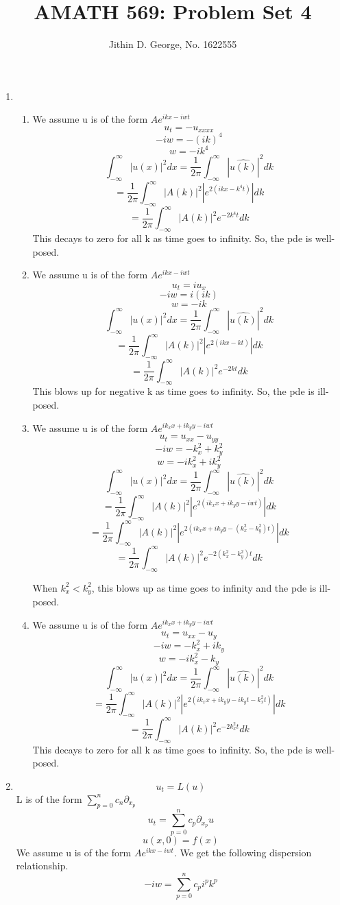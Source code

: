 \documentclass[a4paper,12 pt]{article}
\title{AMATH 569: Problem Set 4}
\author{Jithin D. George, No. 1622555}
\begin{document}
\maketitle
\begin{enumerate}
	\item
 
 \begin{enumerate}
	
	\item 
	We assume  u is of the form $A e^{ikx-iwt}$
	\[u_t=-u_{xxxx}\]
	\[-iw = - (ik)^4\]
	\[w= -ik^4\]
	\[\int_{-\infty}^{\infty}|u(x)|^2 dx= \frac{1}{2\pi}\int_{-\infty}^{\infty}|\hat{u(k)}|^2 dk\]
	\[= \frac{1}{2\pi}\int_{-\infty}^{\infty}|A(k)|^2|e^{2(ikx-k^4t)}| dk\]
	\[= \frac{1}{2\pi}\int_{-\infty}^{\infty}|A(k)|^2e^{-2k^4t} dk\]
	This decays to zero for all k as time goes to infinity. So, the pde is well-posed.
	\item
	We assume  u is of the form $A e^{ikx-iwt}$
	\[u_t=iu_{x}\]
	\[-iw = i(ik)\]
	\[w= -ik\]
	\[\int_{-\infty}^{\infty}|u(x)|^2 dx= \frac{1}{2\pi}\int_{-\infty}^{\infty}|\hat{u(k)}|^2 dk\]
	\[= \frac{1}{2\pi}\int_{-\infty}^{\infty}|A(k)|^2|e^{2(ikx-kt)}| dk\]
	\[= \frac{1}{2\pi}\int_{-\infty}^{\infty}|A(k)|^2 e^{-2kt}dk\]
	This blows up for negative k as time goes to infinity. So, the pde is ill-posed.
	\item
	We assume  u is of the form $A e^{ik_xx+ik_yy-iwt}$
	\[u_t=u_{xx}-u_{yy}\]
	\[-iw = -k_x^2+k_y^2\]
	\[w= -ik_x^2+ik_y^2\]
	\[\int_{-\infty}^{\infty}|u(x)|^2 dx= \frac{1}{2\pi}\int_{-\infty}^{\infty}|\hat{u(k)}|^2 dk\]
	\[= \frac{1}{2\pi}\int_{-\infty}^{\infty}|A(k)|^2|e^{2(ik_xx+ik_yy-iwt)}| dk\]
	\[= \frac{1}{2\pi}\int_{-\infty}^{\infty}|A(k)|^2|e^{2(ik_xx+ik_yy-(k_x^2-k_y^2)t)}| dk\]
	\[= \frac{1}{2\pi}\int_{-\infty}^{\infty}|A(k)|^2e^{-2(k_x^2-k_y^2)t} dk\]

	When $k_x^2< k_y^2$, this blows up as time goes to infinity and the pde is ill-posed.
	\item
	We assume  u is of the form $A e^{ik_xx+ik_yy-iwt}$
	\[u_t=u_{xx}-u_{y}\]
	\[-iw = -k_x^2+ik_y\]
	\[w= -ik_x^2-k_y\]
	\[\int_{-\infty}^{\infty}|u(x)|^2 dx= \frac{1}{2\pi}\int_{-\infty}^{\infty}|\hat{u(k)}|^2 dk\]
	\[= \frac{1}{2\pi}\int_{-\infty}^{\infty}|A(k)|^2|e^{2(ik_xx+ik_yy-ik_yt-k_x^2t)}| dk\]
	\[= \frac{1}{2\pi}\int_{-\infty}^{\infty}|A(k)|^2e^{-2k_x^2t} dk\]
	This decays to zero for all k as time goes to infinity. So, the pde is well-posed.
	
	\end{enumerate}
	\item
	\[u_t =L(u)\]
	L is of the form $\sum_{p=0}^{n}c_n\partial_{x_p}$
	\[u_t =\sum_{p=0}^{n}c_p\partial_{x_p}u\]
	\[u(x,0)=f(x)\]
	We assume  u is of the form $A e^{ikx-iwt}$. We get the following dispersion relationship.
	\[-iw= \sum_{p=0}^{n} c_p i^pk^p\]


\end{enumerate}
\end{document}
